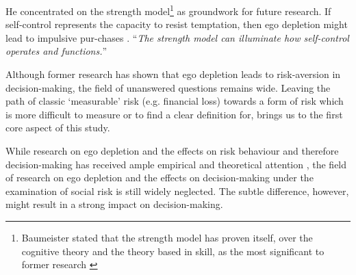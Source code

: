 He concentrated on the strength model\footnote{Baumeister stated that the strength model has proven itself, over the cognitive theory and the theory based in skill, as the most significant to former research \citep{baumeister2012self}} as groundwork for future research. If self-control represents the capacity to resist temptation, then ego depletion might lead to impulsive pur-chases \citep{baumeister2002yielding,baumeister2012self}. “\emph{The strength model can illuminate how self-control operates and functions.}” \cite{baumeister2007strength}\par
Although former research has shown that ego depletion leads to risk-aversion in decision-making, the field of unanswered questions remains wide. Leaving the path of classic ‘measurable’ risk (e.g. financial loss) towards a form of risk which is more difficult to measure or to find a clear definition for, brings us to the first core aspect of this study. \par
While research on ego depletion and the effects on risk behaviour and therefore decision-making has received ample empirical and theoretical attention \citep{vohs2008making,vohs2007spent,unger2011ego}, the field of research on ego depletion and the effects on decision-making under the examination of social risk is still widely neglected. The subtle difference, however, might result in a strong impact on decision-making.\par

